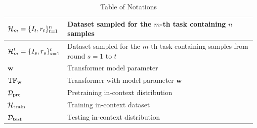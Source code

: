 \begin{table}[!tbh]
\begin{tabular}{|p{10em}|p{28em}|}
        $\mathcal{H}_m  = \{I_t, r_t\}_{t=1}^n$  & Dataset sampled for the $m$-th task containing $n$ samples\\\hline
        $\mathcal{H}^t_m = \{I_s, r_s\}_{s=1}^t$  & Dataset sampled for the $m$-th task containing samples from round $s=1$ to $t$\\\hline
        $\mathbf{w}$ & Transformer model parameter\\\hline
        $\mathrm{TF}_{\mathbf{w}}$ & Transformer with model parameter $\mathbf{w}$\\\hline
        $\mathcal{D}_{\text{pre}}$  & Pretraining in-context distribution\\\hline
        $\mathcal{H}_{\text{train}}$  & Training in-context dataset\\\hline
        $\mathcal{D}_{\text{test}}$  & Testing in-context distribution\\\hline%
    \end{tabular}
    \vspace{1em}
    \caption{Table of Notations}
    \label{tab:my_label}
\end{table}









